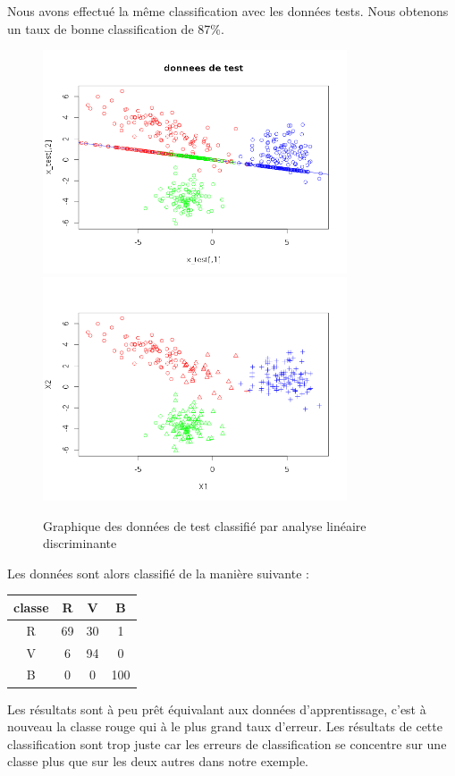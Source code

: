 \documentclass[a4paper,11pt]{article}
\begin{document}
  Nous avons effectué la même classification avec les données tests. Nous obtenons un taux de bonne classification
  de 87\%.
  
  \begin{figure}[H]
  \center
  \includegraphics[width=9cm]{test_acp.png}
   \includegraphics[width=9cm]{test_classifie.png}
   \caption{Graphique des données de test classifié par analyse linéaire discriminante}
  \end{figure}
  
  Les données sont alors classifié de la manière suivante :
  \begin{center}
  \begin{tabular}{|c|c|c|c|}
   \hline
   classe & R & V & B\\
   \hline
   R & 69 & 30 & 1 \\
   \hline
   V & 6 & 94 & 0 \\
   \hline
   B & 0 & 0 & 100 \\
   \hline
  \end{tabular}
  \end{center}
  
  Les résultats sont à peu prêt équivalant aux données d'apprentissage, c'est à nouveau la classe rouge
  qui à le plus grand taux d'erreur. Les résultats de cette classification sont trop juste car les erreurs
  de classification se concentre sur une classe plus que sur les deux autres dans notre exemple.
  
\end{document}
